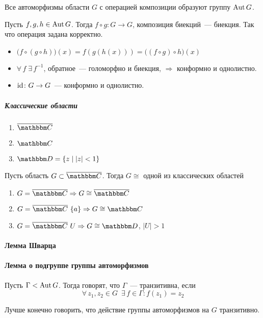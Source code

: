 \documentclass[12pt,timbord]{../../../notes}
\begin{document}
\begin{prop}\label{prop:tfcv::riemanaut::autgroup}
  Все автоморфизмы области $G$ с операцией композиции образуют группу $\operatorname{Aut} G$.
\end{prop}
\begin{itlproof}
  Пусть $f, g, h\in \operatorname{Aut} G$. Тогда $f \circ g \colon G \to G$, композиция биекций~--- биекция. Так
  что операция задана корректно.
  \begin{itemize}
    \item $\bigl(f \circ (g\circ h)\bigr)(x) = f(g(h(x))) = \bigl((f \circ g)\circ h\bigr)(x)$
    \item $\forall\, f\; \exists\,f^{-1}$, обратное~--- голоморфно и биекция, $ \Rightarrow $
      конформно и однолистно.
    \item $\operatorname{id}\colon G\to G$~--- конформно и однолистно. 
  \end{itemize}
\end{itlproof}

\subparagraph{Классические области}
\begin{enumerate}
  \item $\overline{\C}$
  \item ${\C}$
  \item $\D = \{z\mid |z| < 1\}$
\end{enumerate}

\begin{thrm}[Римана]\label{thrm:tfcv::riemanaut::rieman}
  Пусть область $G \subset \exC $. Тогда $G\cong$ одной из классических областей
  \begin{enumerate}
    \item $G = \exC \Rightarrow G \cong \exC$
    \item $G = \exC \ \{a\} \Rightarrow G \cong \C$
    \item $G = \exC \ U \Rightarrow G \cong \D$, $|U| > 1$
  \end{enumerate}
\end{thrm}

\paragraph{Лемма Шварца}
\label{par:tfcv::shwartz}


\paragraph{Лемма о подгруппе группы автоморфизмов}
\label{par:tfcv::subautgr}

\begin{defn}\label{defn:tfcv::subautgr::trans}
  Пусть $\Gamma < \operatorname{Aut} G$. Тогда говорят, что $\Gamma$~--- транзитивна, если
  \[\forall\, z_1, z_2 \in G\;\: \exists\, f \in \Gamma\colon f(z_1) = z_2\]
\end{defn}
\begin{rem*}
  Лучше конечно говорить, что действие группы автоморфизмов на $G$ транзитивно.
\end{rem*}
\end{document}
